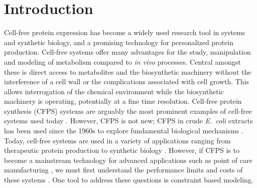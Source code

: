 \documentclass[journal=asbcd6,manuscript=article]{achemso}
\begin{document}
\section{Introduction}
Cell-free protein expression has become a widely used research tool in systems and synthetic biology, and a promising technology for personalized protein production.
Cell-free systems offer many advantages for the study, manipulation and modeling of metabolism compared to \textit{in vivo} processes.
Central amongst these is direct access to metabolites and the biosynthetic machinery without the interference of a cell wall or the complications associated with cell growth.
This allows interrogation of the chemical environment while the biosynthetic machinery is operating, potentially at a fine time resolution.
Cell-free protein synthesis (CFPS) systems are arguably the most prominent examples of cell-free systems used today \cite{Jewett:2008aa}.
However, CFPS is not new; CFPS in crude \textit{E.~coli} extracts has been used since the 1960s to explore fundamental biological mechanisms \cite{MATTHAEI:1961aa,NIRENBERG:1961aa}.
Today, cell-free systems are used in a variety of applications ranging from therapeutic protein production \cite{Lu:2014aa} to synthetic biology \cite{Hodgman:2012aa}.
However, if CFPS is to become a mainstream technology for advanced applications such as point of care manufacturing \cite{Pardee:2016aa}, we must first understand the performance limits and costs of these systems \cite{Jewett:2008aa}.
One tool to address these questions is constraint based modeling.

\end{document}
